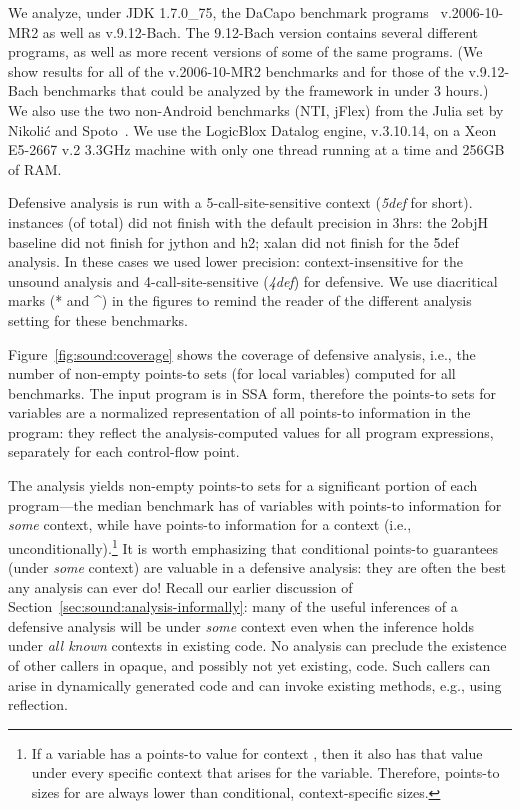 We analyze, under JDK 1.7.0\_75, the DaCapo benchmark programs~\cite{oopsla:2006:Blackburn} v.2006-10-MR2 as well as v.9.12-Bach. The 9.12-Bach version contains several different programs, as well as more recent versions of some of the same programs. (We show results for all of the v.2006-10-MR2 benchmarks and for those of the v.9.12-Bach benchmarks that could be analyzed by the \doop{} framework in under 3 hours.) We also use the two non-Android benchmarks (NTI, jFlex) from the Julia set by Nikoli\'{c} and Spoto~\cite{ictac:2012:Nikolic}. We use the LogicBlox Datalog engine, v.3.10.14, on a Xeon E5-2667 v.2 3.3GHz machine with only one thread running at a time and 256GB of RAM.

Defensive analysis is run with a 5-call-site-sensitive context (\emph{5def} for short).  instances (of  total) did not finish with the default precision in 3hrs: the 2objH baseline did not finish for jython and h2; xalan did not finish for the 5def analysis. In these cases we used lower precision: context-insensitive for the unsound analysis and 4-call-site-sensitive (\emph{4def}) for defensive. We use diacritical marks (* and \^{}) in the figures to remind the reader of the different analysis setting for these benchmarks.


Figure~\ref{fig:sound:coverage} shows the coverage of defensive analysis, i.e., the number of non-empty points-to sets (for local variables) computed for all benchmarks. The input program is in SSA form, therefore the points-to sets for variables are a normalized representation of all points-to information in the program: they reflect the analysis-computed values for all program expressions, separately for each control-flow point.

The analysis yields non-empty points-to sets for a significant portion of each program---the median benchmark has  of variables with points-to information for \emph{some} context, while  have points-to information for a context \ctxInit{} (i.e., unconditionally).\footnote{If a variable has a points-to value for context \ctxInit{}, then it also has that value under every specific context that arises for the variable. Therefore, points-to sizes for \ctxInit{} are always lower than conditional, context-specific sizes.} It is worth emphasizing that conditional points-to guarantees (under \emph{some} context) are valuable in a defensive analysis: they are often the best any analysis can ever do! Recall our earlier discussion of Section~\ref{sec:sound:analysis-informally}: many of the useful inferences of a defensive analysis will be under \emph{some} context even when the inference holds under \emph{all known} contexts in existing code. No analysis can preclude the existence of other callers in opaque, and possibly not yet existing, code. Such callers can arise in dynamically generated code and can invoke existing methods, e.g., using reflection.

